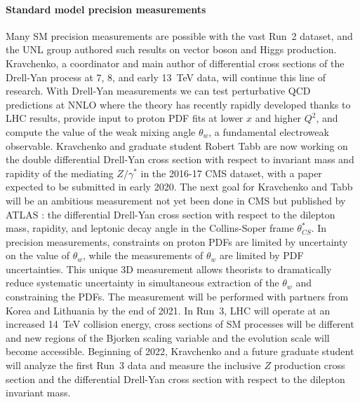 \paragraph{Standard model precision measurements}
Many SM precision measurements are possible with the vast Run~2 dataset, and the UNL group authored such results on vector boson and Higgs production. Kravchenko, a coordinator and main author of differential cross sections of the Drell-Yan process at 7, 8, and early 13~TeV data, will continue this line of research. With Drell-Yan measurements we can test perturbative QCD predictions at NNLO where the theory has recently rapidly developed thanks to LHC results, provide input to proton PDF fits at lower $x$ and higher $Q^2$, and compute the value of the weak mixing angle $\theta_w$, a fundamental electroweak observable. 
Kravchenko and graduate student Robert Tabb are now working on the double differential Drell-Yan cross section with respect to invariant mass and rapidity of the mediating $Z/\gamma^*$ in the 2016-17 CMS dataset, with a paper expected to be submitted in early 2020. The next goal for Kravchenko and Tabb will be an ambitious measurement not yet been done in CMS but published by ATLAS \cite{bib:ATLAS-3D}: the differential Drell-Yan cross section with respect to the dilepton mass, rapidity, and leptonic decay angle in the Collins-Soper frame $\theta^*_{CS}$. In precision measurements, constraints on proton PDFs are limited by uncertainty on the value of $\theta_w$, while the measurements of $\theta_w$ are limited by PDF uncertainties. This unique 3D measurement allows theorists to dramatically reduce systematic uncertainty in simultaneous extraction of the $\theta_w$ and constraining the PDFs. The measurement will be performed with partners from Korea and Lithuania by the end of 2021. In Run~3, LHC will operate at an increased 14~TeV collision energy, cross sections of SM processes will be different and new regions of the Bjorken scaling variable and the evolution scale will become accessible. Beginning of 2022, Kravchenko and a future graduate student will analyze the first Run~3 data and measure the inclusive $Z$ production cross section and the differential Drell-Yan cross section with respect to the dilepton invariant mass.

